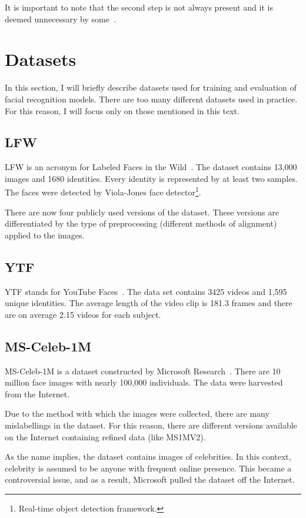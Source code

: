 It is important to note that the second step is not always present and it is deemed unnecessary by some~\cite{FaceNet}.

\section{Datasets}\label{sec:datasets}
In this section, I will briefly describe datasets used for training and evaluation of facial recognition models.
There are too many different datasets used in practice.
For this reason, I will focus only on those mentioned in this text.

\subsection{LFW}\label{subsec:lfw}
LFW is an acronym for Labeled Faces in the Wild~\cite{LFW}.
The dataset contains 13,000 images and 1680 identities.
Every identity is represented by at least two samples.
The faces were detected by Viola-Jones face detector\footnote{Real-time object detection framework.}.

There are now four publicly used versions of the dataset.
These versions are differentiated by the type of preprocessing (different methods of alignment) applied to the images.

\subsection{YTF}\label{subsec:ytf}
YTF stands for YouTube Faces~\cite{YTF}.
The data set contains 3425 videos and 1,595 unique identities.
The average length of the video clip is 181.3 frames and there are on average 2.15 videos for each subject.

\subsection{MS-Celeb-1M}\label{subsec:ms1m}
MS-Celeb-1M is a dataset constructed by Microsoft Research~\cite{MSCELEB1M}.
There are 10 million face images with nearly 100,000 individuals.
The data were harvested from the Internet.

Due to the method with which the images were collected, there are many mislabellings in the dataset.
For this reason, there are different versions available on the Internet containing refined data (like MS1MV2).

As the name implies, the dataset contains images of celebrities.
In this context, celebrity is assumed to be anyone with frequent online presence.
This became a controversial issue, and as a result, Microsoft pulled the dataset off the Internet.



